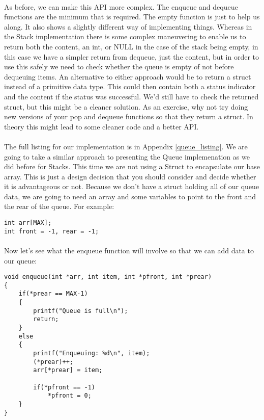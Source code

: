 \documentclass[10pt, a4paper, twosize]{article}
\begin{document}
\paragraph{} As before, we can make this API more complex. The enqueue and dequeue functions are the minimum that is required. The empty function is just to help us along. It also shows a slightly different way of implementing things. Whereas in the Stack implementation there is some complex maneuvering to enable us to return both the content, an int, or NULL in the case of the stack being empty, in this case we have a simpler return from dequeue, just the content, but in order to use this safely we need to check whether the queue is empty of not before dequeuing items. An alternative to either approach would be to return a struct instead of a primitive data type. This could then contain both a status indicator and the content if the status was successful. We'd still have to check the returned struct, but this might be a cleaner solution. As an exercise, why not try doing new versions of your pop and dequeue functions so that they return a struct. In theory this might lead to some cleaner code and a better API.

\paragraph{} The full listing for our implementation is in Appendix \ref{queue_listing}. We are going to take a similar approach to presenting the Queue implemenation as we did before for Stacks. This time we are not using a Struct to encapsulate our base array. This is just a design decision that you should consider and decide whether it is advantageous or not. Because we don't have a struct holding all of our queue data, we are going to need an array and some variables to point to the front and the rear of the queue. For example:

\begin{lstlisting}
int arr[MAX];
int front = -1, rear = -1;
\end{lstlisting}

\paragraph{} Now let's see what the enqueue function will involve so that we can add data to our queue:

\begin{lstlisting}
void enqueue(int *arr, int item, int *pfront, int *prear)
{
    if(*prear == MAX-1)
    {
        printf("Queue is full\n");
        return;
    }
    else
    {
        printf("Enqueuing: %d\n", item);
        (*prear)++;
        arr[*prear] = item;

        if(*pfront == -1)
            *pfront = 0;
    }
}
\end{lstlisting}
\end{document}
